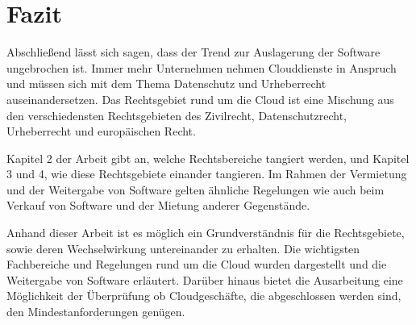 \chapter{Fazit}
Abschließend lässt sich sagen, dass der Trend zur Auslagerung der Software ungebrochen ist.
Immer mehr Unternehmen nehmen Clouddienste in Anspruch und müssen sich mit dem Thema Datenschutz und Urheberrecht auseinandersetzen.
Das Rechtsgebiet rund um die Cloud ist eine Mischung aus den verschiedensten Rechtsgebieten des Zivilrecht, Datenschutzrecht, Urheberrecht und europäischen Recht.\par
Kapitel 2 der Arbeit gibt an, welche Rechtsbereiche tangiert werden, und Kapitel 3 und 4, wie diese Rechtsgebiete einander tangieren.
Im Rahmen der Vermietung und der Weitergabe von Software gelten ähnliche Regelungen wie auch beim Verkauf von Software und der Mietung anderer Gegenstände.\par
Anhand dieser Arbeit ist es möglich ein Grundverständnis für die Rechtsgebiete, sowie deren Wechselwirkung untereinander zu erhalten.
Die wichtigsten Fachbereiche und Regelungen rund um die Cloud wurden dargestellt und die Weitergabe von Software erläutert.
Darüber hinaus bietet die Ausarbeitung eine Möglichkeit der Überprüfung ob Cloudgeschäfte, die abgeschlossen werden sind, den Mindestanforderungen genügen.\par
